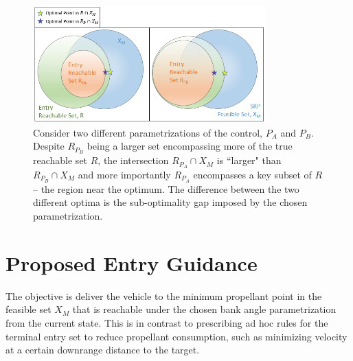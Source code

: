 \documentclass[letterpaper, preprint, paper,11pt]{AAS}
\begin{document}
\begin{figure}[h!]
	\centering
	\includegraphics[width=0.8\textwidth]{SetDefinitions} 
	\caption{Consider two different parametrizations of the control, $ P_A $ and $ P_B $. Despite $ R_{P_B} $ being a larger set encompassing more of the true reachable set $R$, the intersection $R_{P_A}\cap X_M$ is ``larger" than $R_{P_B}\cap X_M$ and more importantly $ R_{P_A} $ encompasses a key subset of $ R $ – the region near the optimum. The difference between the two different optima is the sub-optimality gap imposed by the chosen parametrization.}
	\label{fig_sets}
\end{figure}

 



\section{Proposed Entry Guidance}


The objective is deliver the vehicle to the minimum propellant point in the feasible set $X_M$ that is reachable under the chosen bank angle parametrization from the current state. This is in contrast to prescribing ad hoc rules for the terminal entry set to reduce propellant consumption, such as minimizing velocity at a certain downrange distance to the target. 
\end{document}
